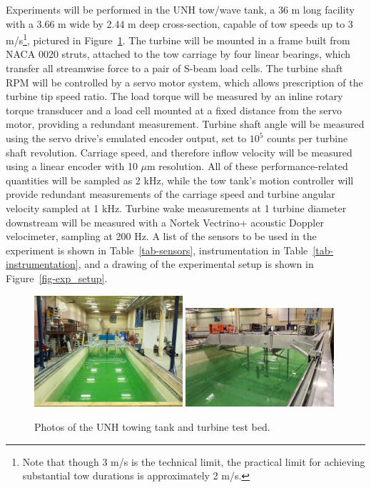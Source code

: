 \documentclass[12pt,letterpaper]{scrreprt}
\begin{document}
Experiments will be performed in the UNH tow/wave tank, a 36 m long facility
with a 3.66 m wide by 2.44 m deep cross-section, capable of tow speeds up to 3
m/s\footnote{Note that though 3 m/s is the technical limit, the practical limit
for achieving substantial tow durations is approximately 2 m/s.}, pictured in
Figure~\ref{fig-tow_tank}. The turbine will be mounted in a frame built from
NACA 0020 struts, attached to the tow carriage by four linear bearings, which
transfer all streamwise force to a pair of S-beam load cells. The turbine shaft
RPM will be controlled by a servo motor system, which allows prescription of the
turbine tip speed ratio. The load torque will be measured by an inline rotary
torque transducer and a load cell mounted at a fixed distance from the servo
motor, providing a redundant measurement. Turbine shaft angle will be measured
using the servo drive's emulated encoder output, set to $10^5$ counts per
turbine shaft revolution. Carriage speed, and therefore inflow velocity will be
measured using a linear encoder with 10 $\mu$m resolution. All of these
performance-related quantities will be sampled as 2 kHz, while the tow tank's
motion controller will provide redundant measurements of the carriage speed and
turbine angular velocity sampled at 1 kHz. Turbine wake measurements at 1
turbine diameter downstream will be measured with a Nortek Vectrino+ acoustic
Doppler velocimeter, sampling at 200 Hz. A list of the sensors to be used in the
experiment is shown in Table~\ref{tab-sensors}, instrumentation in
Table~\ref{tab-instrumentation}, and a drawing of the experimental setup is
shown in Figure~\ref{fig-exp_setup}.


\begin{figure}[ht!]
\centering 
\includegraphics[clip,trim=0 0.4in 0 0.37in, 
width=0.49\textwidth]{Figures/tow_tank_length} 
\includegraphics[clip,trim=0.67in 0 0 0, 
width=0.49\textwidth]{Figures/test_bed_photo} 
\caption{Photos of the UNH towing tank and turbine test bed.} 
\label{fig-tow_tank}
\end{figure}
\end{document}
